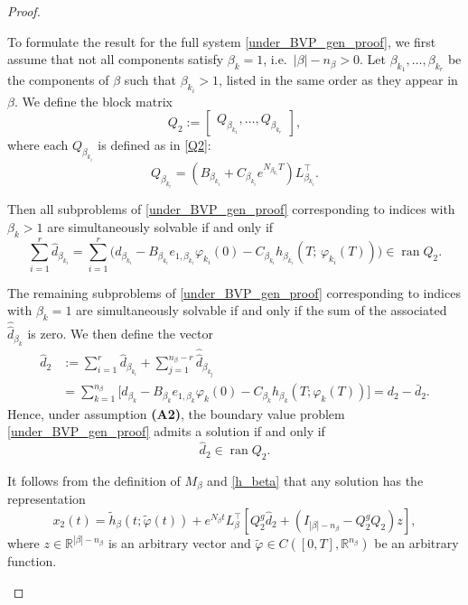 \documentclass[preprint,12pt]{elsarticle}
\numberwithin{equation}{section}
\theoremstyle{definition}
\begin{document}
\begin{proof}
\begin{itemize}
To formulate the result for the full system \eqref{under_BVP_gen_proof}, we first assume that not all components satisfy $\beta_k=1$, i.e.\ $|\beta|-n_\beta>0$.  Let \( \beta_{k_1}, \ldots, \beta_{k_r} \) be the components of \( \beta \) such that \( \beta_{k_i} > 1 \), listed in the same order as they appear in \( \beta \). We define the block matrix
\[
Q_2 := \begin{bmatrix}
Q_{\beta_{k_1}}, \ldots,  Q_{\beta_{k_r}}
\end{bmatrix},
\]
where each \( Q_{\beta_{k_i}} \) is defined as in \eqref{Q2}:
\[
Q_{\beta_{k_i}} = \left( B_{\beta_{k_i}} + C_{\beta_{k_i}} e^{N_{\beta_{k_i}} T} \right) L_{\beta_{k_i}}^\top.
\]

Then all subproblems of \eqref{under_BVP_gen_proof} corresponding to indices with \(\beta_k>1\) are simultaneously solvable if and only if
\[
\sum_{i=1}^{r} \widehat{d}_{\beta_{k_i}}
= \sum_{i=1}^{r} \bigl( d_{\beta_{k_i}} - B_{\beta_{k_i}} e_{1,\beta_{k_i}} \varphi_{k_i}(0) - C_{\beta_{k_i}} h_{\beta_{k_i}}(T;\,\varphi_{k_i}(T)) \bigr) \in \operatorname{ran} Q_2.
\]

The remaining subproblems of \eqref{under_BVP_gen_proof} corresponding to indices with $\beta_k=1$ are simultaneously solvable if and only if the sum of the associated  $\hat{\hat{d}}_{\beta_k}$ is zero. We then define the vector
\begin{equation*}\label{hat_d_2}
\begin{aligned}
    \widehat{d}_2 
&:= \sum_{i=1}^{r} \widehat{d}_{\beta_{k_i}} +
 \sum_{j=1}^{n_\beta-r} \hat{\hat{d}}_{\beta_{k_j}}\\
&=\sum_{k=1}^{n_\beta} \big[ d_{\beta_k} - B_{\beta_k} e_{1,\beta_k} \varphi_k(0) - C_{\beta_k} h_{\beta_k}(T; \varphi_k(T)) \big]= d_2 - \bar{d}_2.
\end{aligned}
\end{equation*}
Hence, under assumption \textbf{(A2)}, the boundary value problem \eqref{under_BVP_gen_proof} admits a solution if and only if
\[
\widehat{d}_2 \in  \operatorname{ran} Q_2.
\]



It follows from the definition of $M_\beta$ and \eqref{h_beta}
that
any solution has the representation
\begin{equation}\label{sol_xbeta_proof}
    x_2(t) = \widetilde{h}_\beta(t; \widetilde{\varphi}(t)) + e^{N_\beta t} L_\beta^\top \left[ Q_2^g \widehat{d}_2 + (I_{|\beta| - n_\beta} - Q_2^g Q_2) z \right],
\end{equation}
where $z\in\mathbb{R}^{|\beta| - n_\beta}$ is an arbitrary vector and
 $\widetilde{\varphi}\in C([0,T],\mathbb{R}^{n_{\beta}})$ be an arbitrary function. 
\smallskip




\end{itemize}
\end{proof}
\end{document}
